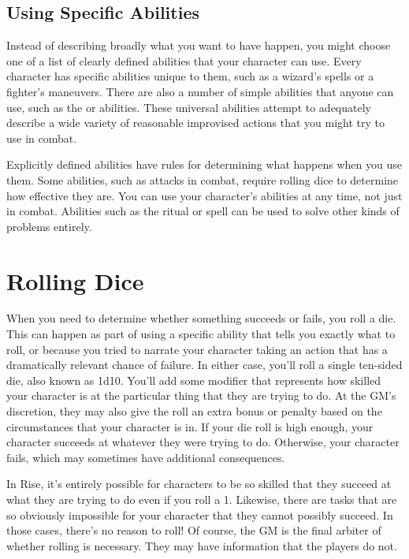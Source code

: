   \subsection{Using Specific Abilities}
    Instead of describing broadly what you want to have happen, you might choose one of a list of clearly defined abilities that your character can use.
    Every character has specific abilities unique to them, such as a wizard's spells or a fighter's maneuvers.
    There are also a number of simple abilities that anyone can use, such as the  or  abilities.
    These universal abilities attempt to adequately describe a wide variety of reasonable improvised actions that you might try to use in combat.

    Explicitly defined abilities have rules for determining what happens when you use them.
    Some abilities, such as attacks in combat, require rolling dice to determine how effective they are.
    You can use your character's abilities at any time, not just in combat.
    Abilities such as the  ritual or  spell can be used to solve other kinds of problems entirely.

\section{Rolling Dice}
  When you need to determine whether something succeeds or fails, you roll a die.
  This can happen as part of using a specific ability that tells you exactly what to roll, or because you tried to narrate your character taking an action that has a dramatically relevant chance of failure.
  In either case, you'll roll a single ten-sided die, also known as 1d10.
  You'll add some modifier that represents how skilled your character is at the particular thing that they are trying to do.
  At the GM's discretion, they may also give the roll an extra bonus or penalty based on the circumstances that your character is in.
  If your die roll is high enough, your character succeeds at whatever they were trying to do.
  Otherwise, your character fails, which may sometimes have additional consequences.

  In Rise, it's entirely possible for characters to be so skilled that they succeed at what they are trying to do even if you roll a 1.
  Likewise, there are tasks that are so obviously impossible for your character that they cannot possibly succeed.
  In those cases, there's no reason to roll!
  Of course, the GM is the final arbiter of whether rolling is necessary.
  They may have information that the players do not.

